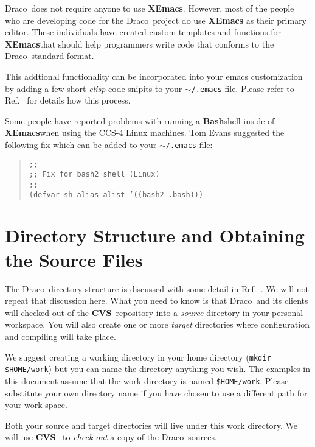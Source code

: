 \documentclass[10pt]{nmemo}
\newcommand{\comp}[1]{\normalfont\normalsize\texttt{#1}}
\newcommand{\draco}{{\normalfont\sffamily Draco}}
\newcommand{\cvs}{{\normalfont\bfseries CVS}}
\newcommand{\xemacs}{{\normalfont\bfseries XEmacs}}
\newcommand{\bash}{{\normalfont\bfseries Bash}}
\begin{document}
\draco\ does not require anyone to use \xemacs.  However, most of the
people who are developing code for the \draco\ project do use \xemacs
as their primary editor.  These individuals have created custom
templates and functions for \xemacs that should help programmers write 
code that conforms to the \draco\ standard format.

This addtional functionality can be incorporated into your emacs
customization by adding a few short \emph{elisp} code snipits to your
\comp{$\sim$/.emacs} file.  Please refer to Ref.~\cite{xtm:9909} for
details how this process.

Some people have reported problems with running a \bash shell inside
of \xemacs when using the CCS-4 Linux machines.  Tom Evans suggested
the following fix which can be added to your \comp{$\sim$/.emacs} file:

\footnotesize
\begin{verse}
\texttt{;; \\
;; Fix for bash2 shell (Linux) \\
;; \\
(defvar sh-alias-alist '((bash2 .bash)))} 
\end{verse}
\normalsize


\section{Directory Structure and Obtaining the Source Files}

The \draco\ directory structure is discussed with some detail in
Ref.~\cite{draco-build}.  We will not repeat that discussion here.
What you need to know is that \draco\ and its clients will checked out 
of the \cvs\ repository into a \emph{source} directory in your
personal workspace.  You will also create one or more \emph{target}
directories where configuration and compiling will take place.

We suggest creating a working directory in your home directory
(\comp{mkdir \${HOME}/work}) but you can name the directory anything
you wish.  The examples in this document assume that the work
directory is named \comp{\${HOME}/work}.  Please substitute your own
directory name if you have chosen to use a different path for your
work space.

Both your source and target directories will live under this work
directory.  We will use \cvs~\cite{cvs} to \emph{check out} a copy of
the \draco\ sources.  
\end{document}
